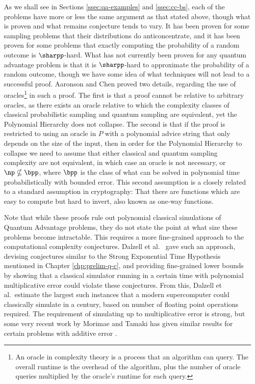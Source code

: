 As we shall see in Sections \ref{ssec:qa-examples} and \ref{ssec:cc-bs}, each of the problems have more or less the same argument as that stated above, though what is proven and what remains conjecture tends to vary. It has been proven for some sampling problems that their distributions do anticoncentrate, and it has been proven for some problems that exactly computing the probability of a random outcome is $\sharpp$-hard. What has not currently been proven for any quantum advantage problem is that it is $\sharpp$-hard to approximate the probability of a random outcome, though we have some idea of what techniques will not lead to a successful proof. Aaronson and Chen \cite{aaronson2016chen} proved two details, regarding the use of oracles\footnote{An oracle in complexity theory is a process that an algorithm can query. The overall runtime is the overhead of the algorithm, plus the number of oracle queries multiplied by the oracle's runtime for each query.} in such a proof. The first is that a proof cannot be relative to arbitrary oracles, as there exists an oracle relative to which the complexity classes of classical probabilistic sampling and quantum sampling are equivalent, yet the Polynomial Hierarchy does not collapse. The second is that if the proof is restricted to using an oracle in $P$ with a polynomial advice string that only depends on the size of the input, then in order for the Polynomial Hierarchy to collapse we need to assume that either classical and quantum sampling complexity are not equivalent, in which case an oracle is not necessary, or $\np \nsubseteq \bpp$, where $\bpp$ is the class of what can be solved in polynomial time probabilistically with bounded error. This second assumption is a closely related to a standard assumption in cryptography: That there are functions which are easy to compute but hard to invert, also known as one-way functions.

Note that while these proofs rule out polynomial classical simulations of Quantum Advantage problems, they do not state the point at what size these problems become intractable. This requires a more fine-grained approach to the computational complexity conjectures. Dalzell et al.~\cite{dalzell2017, dalzell2018} gave such an approach, devising conjectures similar to the Strong Exponential Time Hypothesis mentioned in Chapter \ref{chp:prelim-q-c}, and providing fine-grained lower bounds by showing that a classical simulator running in a certain time with polynomial multiplicative error could violate these conjectures. From this, Dalzell et al.\ estimate the largest such instances that a modern supercomputer could classically simulate in a century, based on number of floating point operations required. The requirement of simulating up to multiplicative error is strong, but some very recent work by Morimae and Tamaki has given similar results for certain problems with additive error \cite{morimae2019}.


